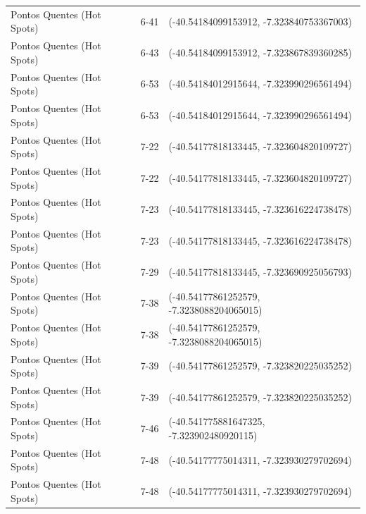 \documentclass[dvipsnames]{article}%
\begin{document}
\begin{table}[h!]
\begin{tabular}{lll}
Pontos Quentes (Hot Spots)&6{-}41&({-}40.54184099153912, {-}7.323840753367003)\\%
Pontos Quentes (Hot Spots)&6{-}43&({-}40.54184099153912, {-}7.323867839360285)\\%
Pontos Quentes (Hot Spots)&6{-}53&({-}40.54184012915644, {-}7.323990296561494)\\%
Pontos Quentes (Hot Spots)&6{-}53&({-}40.54184012915644, {-}7.323990296561494)\\%
Pontos Quentes (Hot Spots)&7{-}22&({-}40.54177818133445, {-}7.323604820109727)\\%
Pontos Quentes (Hot Spots)&7{-}22&({-}40.54177818133445, {-}7.323604820109727)\\%
Pontos Quentes (Hot Spots)&7{-}23&({-}40.54177818133445, {-}7.323616224738478)\\%
Pontos Quentes (Hot Spots)&7{-}23&({-}40.54177818133445, {-}7.323616224738478)\\%
Pontos Quentes (Hot Spots)&7{-}29&({-}40.54177818133445, {-}7.323690925056793)\\%
Pontos Quentes (Hot Spots)&7{-}38&({-}40.54177861252579, {-}7.3238088204065015)\\%
Pontos Quentes (Hot Spots)&7{-}38&({-}40.54177861252579, {-}7.3238088204065015)\\%
Pontos Quentes (Hot Spots)&7{-}39&({-}40.54177861252579, {-}7.323820225035252)\\%
Pontos Quentes (Hot Spots)&7{-}39&({-}40.54177861252579, {-}7.323820225035252)\\%
Pontos Quentes (Hot Spots)&7{-}46&({-}40.541775881647325, {-}7.323902480920115)\\%
Pontos Quentes (Hot Spots)&7{-}48&({-}40.54177775014311, {-}7.323930279702694)\\%
Pontos Quentes (Hot Spots)&7{-}48&({-}40.54177775014311, {-}7.323930279702694)\\%
\bottomrule%
\end{tabular}%
\end{table}

%
\FloatBarrier%
\end{document}
